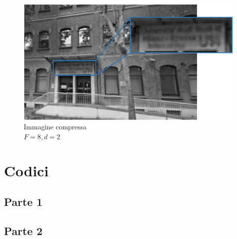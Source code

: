 \documentclass[preprint,12pt]{elsarticle}
\begin{document}
\begin{figure}[H]
	\includegraphics[width=\linewidth]{f4}
	\caption{Immagine compressa\\$F = 8, d = 2$}
	\centering
\end{figure}

\newpage

\section{Codici}

\subsection{Parte 1}



\newpage 
\subsection{Parte 2}


\end{document}
